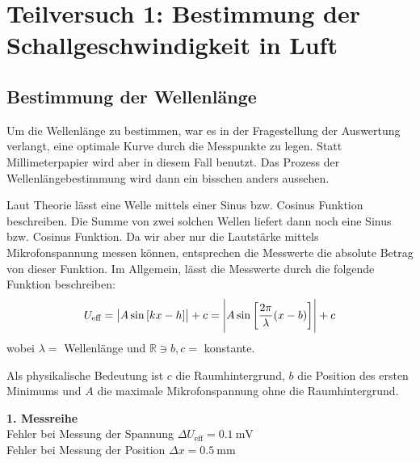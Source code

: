 \section{Teilversuch 1: Bestimmung der Schallgeschwindigkeit in Luft}
	\subsection{Bestimmung der Wellenlänge}
		Um die Wellenlänge zu bestimmen, war es in der Fragestellung der Auswertung verlangt, eine optimale Kurve durch die Messpunkte zu legen. Statt Millimeterpapier wird aber in diesem Fall \gnuplot{} benutzt. Das Prozess der Wellenlängebestimmung wird dann ein bisschen anders aussehen.

		Laut Theorie lässt eine Welle mittels einer Sinus bzw. Cosinus Funktion beschreiben. Die Summe von zwei solchen Wellen liefert dann noch eine Sinus bzw. Cosinus Funktion. Da wir aber nur die Lautstärke mittels Mikrofonspannung messen können, entsprechen die Messwerte die absolute Betrag von dieser Funktion. Im Allgemein, lässt die Messwerte durch die folgende Funktion beschreiben:
		\begin{equation}
			U_\text{eff} = \abs{A\sin\left[kx - h\right]} + c = \abs{A\sin\left[\frac{2\pi}{\lambda}(x - b)\right]} + c
		\end{equation}
		wobei $\lambda =$ Wellenlänge und $\mathbb{R} \ni b, c = $ konstante. 

		Als physikalische Bedeutung ist $c$ die Raumhintergrund, $b$ die Position des ersten Minimums und $A$ die maximale Mikrofonspannung ohne die Raumhintergrund. 

		\newpage
		\textbf{1. Messreihe}\\
		Fehler bei Messung der Spannung $\Delta U_\text{eff} = \SI{0.1}{\milli\volt}$ \\
		Fehler bei Messung der Position $\Delta x = \SI{0.5}{\milli\meter}$ 

